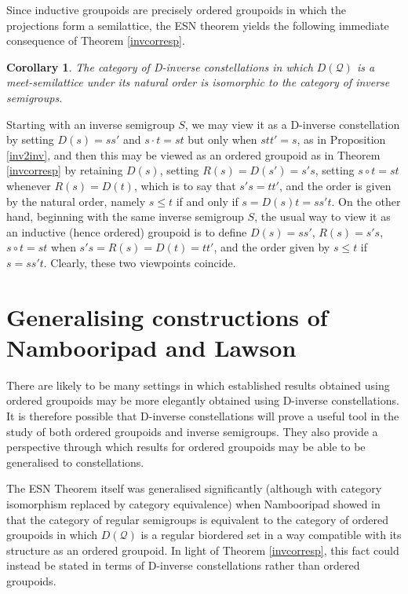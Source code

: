\documentclass[12pt]{amsart}
\newtheorem{cor}[thm]{Corollary}
\theoremstyle{definition}
\newcommand{\Q}{\mathcal Q}
\begin{document}
Since inductive groupoids are precisely ordered groupoids in which the projections form a semilattice, the ESN theorem yields  the following immediate consequence of Theorem \ref{invcorresp}.

\begin{cor}  \label{corinv}
The category of D-inverse constellations in which $D(\Q)$ is a meet-semilattice under its natural order is isomorphic to the category of inverse semigroups.
\end{cor}

Starting with an inverse semigroup $S$, we may view it as a D-inverse constellation by setting $D(s)=ss'$ and $s\cdot t=st$ but only when $stt'=s$, as in Proposition \ref{inv2inv}, and then this may be viewed as an ordered groupoid as in Theorem \ref{invcorresp} by retaining $D(s)$, setting $R(s)=D(s')=s's$, setting $s\circ t=st$ whenever $R(s)=D(t)$, which is to say that $s's=tt'$, and the order is given by the natural order, namely $s\leq t$ if and only if $s=D(s)t=ss't$.  On the other hand, beginning with the same inverse semigroup $S$, the usual way to view it as an inductive (hence ordered) groupoid is to define $D(s)=ss'$, $R(s)=s's$, $s\circ t=st$ when $s's=R(s)=D(t)=tt'$, and the order given by $s\leq t$ if $s=ss't$.  Clearly, these two viewpoints coincide.


\section{Generalising constructions of Nambooripad and Lawson}  \label{sec:construct}

There are likely to be many settings in which established results obtained using ordered groupoids may be more elegantly obtained using D-inverse constellations.  It is therefore possible that D-inverse constellations will prove a useful tool in the study of both ordered groupoids and inverse semigroups.  They also provide a perspective through which results for ordered groupoids may be able to be generalised  to constellations.

The ESN Theorem itself was  generalised significantly (although with category isomorphism replaced by category equivalence) when Nambooripad showed in \cite{nambooripad} that the category of regular semigroups is equivalent to the category of ordered groupoids in which $D(\Q)$ is a regular biordered set in a way compatible with its structure as an ordered groupoid.  In light of Theorem \ref{invcorresp}, this fact could instead be stated in terms of D-inverse constellations rather than ordered groupoids.  
\end{document}

